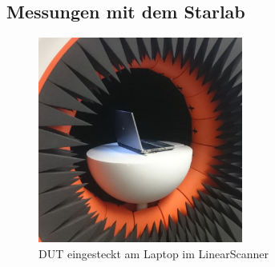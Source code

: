 \newpage
\subsection{Messungen mit dem Starlab}

\begin{figure}[h!]
	\centering
	\includegraphics[width=0.6\textwidth]{../fig/plt/LaptopimStarLab.JPG}
	\caption{DUT eingesteckt am Laptop im LinearScanner}
	\label{fig:LaptopimStarlab}
\end{figure}
